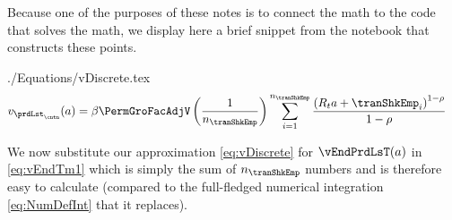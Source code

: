 \documentclass[SolvingMicroDSOPs]{subfiles}
\begin{document}
Because one of the purposes of these notes is to connect the math to the code that solves the math, we display here a brief snippet from the notebook that constructs these points.

\nopagebreak

\begin{verbatimwrite}{./Equations/vDiscrete.tex}
  \begin{equation}\begin{gathered}\begin{aligned}
        \vFunc_{{\prdLst}_\cntn}(\aNrm)  & =   \DiscFac \PermGroFacAdjV\left(\frac{1}{n_{\tranShkEmp}}\right)\sum_{i=1}^{n_{\tranShkEmp}}   \frac{\left(\RNrm_{\prd} \aNrm + \tranShkEmp_{i}\right)^{1-\CRRA}}{1-\CRRA} \label{eq:vDiscrete}
      \end{aligned}\end{gathered}\end{equation}
\end{verbatimwrite}

We now substitute our approximation \eqref{eq:vDiscrete} for $\vEndPrdLsT(a)$ in \eqref{eq:vEndTm1} which is simply the sum of $n_{\tranShkEmp}$ numbers and is therefore easy to calculate (compared to the full-fledged numerical integration \eqref{eq:NumDefInt} that it replaces).

\unskip


\end{document}
